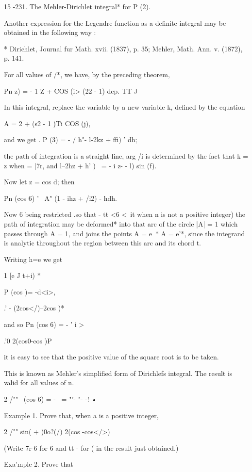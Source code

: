 {{15 -231. The Mehler-Dirichlet integral* for P (2).

Another expression for the Legendre function as a definite integral
may be obtained in the following way :

* Dirichlet, Journal fur Math. xvii. (1837), p. 35; Mehler, Math. Ann.
v. (1872), p. 141.

%
%

For all values of /*, we have, by the preceding theorem,

Pn z) = - 1 Z + COS (i> (22 - 1) dcp. TT J

In this integral, replace the variable by a new variable k, defined by
the equation

A = 2 + (s2 - 1 )Ti COS (j),

and we get . P (3) = - / h"- l-2kz + ffi) ' dh;

the path of integration is a straight line, arg /i is determined by
the fact that k = z when = |7r, and l--2hz + h' )~ = - i z- - l) sin
(f).

Now let z = cos d; then

Pn (cos 6) ' \ A" (1 - ihz + /i2) - hdh.

Now 6 being restricted .so that - tt <6 <\ it when n is not a positive
integer) the path of integration may be deformed* into that arc of the
circle |A| = 1 which passes through A = 1, and joins the points A =
e~* A = e'*, since the integrand is analytic throughout the region
between this arc and its chord t.

Writing h=e we get

1 [e J t+i) *

P (cos )= -d<i>,

  .' - (2cos</)--2cos )*

and so Pn (cos 6) = - ' i >

 .'0 2(cos0-cos )P

it is easy to see that the positive value of the square root is to be
taken.

This is known as Mehler's simplified form of Dirichlefs integral. The
result is valid for all values of n.

2 /"" \ (cos 6) = - \ = "'- "- -! •

Example 1. Prove that, when a is a positive integer,

2 /"" sin( + )0o?(/) 2(cos -cos</>)

(Write 7r-6 for 6 and tt - for ( in the result just obtained.)

Exa'mple 2. Prove that

}}
